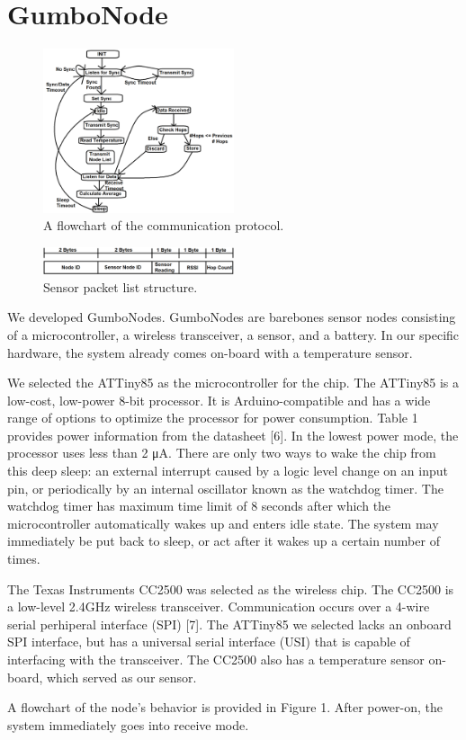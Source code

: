 \section{GumboNode}

\begin{figure}[h!]
  \centering
  \includegraphics[width=0.5\textwidth]{images/algorithm_flowchart.png}
  \caption{A flowchart of the communication protocol.
  \label{img:flowchart}
  }
\end{figure}

\begin{figure}[h!]
  \centering
  \includegraphics[width=0.5\textwidth]{images/packet_structure.png}
  \caption{Sensor packet list structure.
  \label{img:flowchart}
  }
\end{figure}

We developed GumboNodes. GumboNodes are barebones sensor nodes consisting of a microcontroller, a wireless transceiver, a sensor, and a battery. In our specific hardware, the system already comes on-board with a temperature sensor. 

We selected the ATTiny85 as the microcontroller for the chip. The ATTiny85 is a low-cost, low-power 8-bit processor. It is Arduino-compatible and has a wide range of options to optimize the processor for power consumption. Table 1 provides power information from the datasheet [6]. In the lowest power mode, the processor uses less than 2 μA. There are only two ways to wake the chip from this deep sleep: an external interrupt caused by a logic level change on an input pin, or periodically by an internal oscillator known as the watchdog timer. The watchdog timer has maximum time limit of 8 seconds after which the microcontroller automatically wakes up and enters idle state. The system may immediately be put back to sleep, or act after it wakes up a certain number of times.

The Texas Instruments CC2500 was selected as the wireless chip. The CC2500 is a low-level 2.4GHz wireless transceiver. Communication occurs over a 4-wire serial perhiperal interface (SPI) [7]. The ATTiny85 we selected lacks an onboard SPI interface, but has a universal serial interface (USI) that is capable of interfacing with the transceiver. The CC2500 also has a temperature sensor on-board, which served as our sensor. 

A flowchart of the node’s behavior is provided in Figure 1. After power-on, the system immediately goes into receive mode.